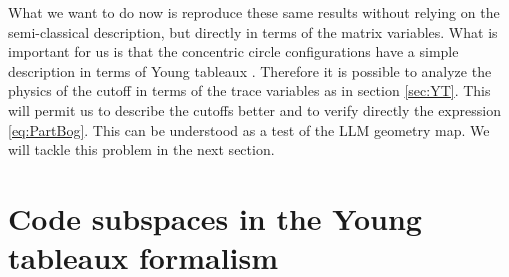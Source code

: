 \documentclass[12pt,nofootinbib, longbibliography]{revtex4-1}
\begin{document}
What we want to do now is reproduce these same results without relying on the semi-classical description, but directly in terms of the matrix variables. What is important for us is that the concentric circle configurations have a simple description in terms of Young tableaux \cite{Lin:2004nb}. Therefore it is possible to analyze the physics of the cutoff in terms of the trace variables as in section \ref{sec:YT}.
This will permit us to describe the cutoffs better and to verify directly the expression \eqref{eq:PartBog}. This can be understood as a test of the LLM geometry map. We will tackle this problem in the next section.

\section{Code subspaces in the Young tableaux formalism}\label{sec:codeyoung}
\end{document}
